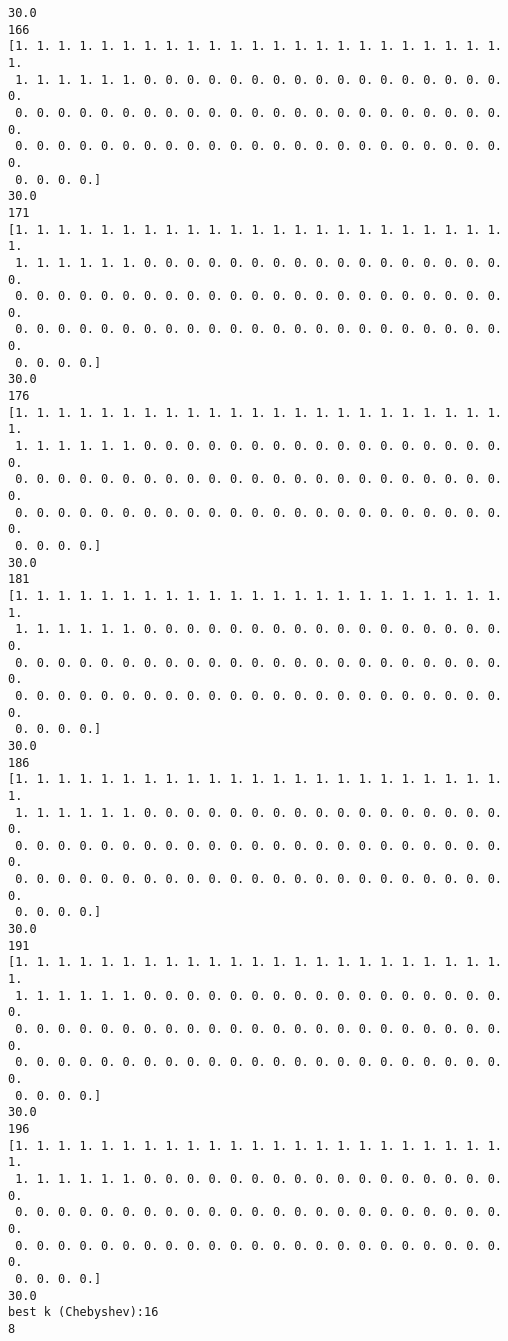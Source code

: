 \documentclass[11pt]{article}
\begin{document}
\begin{Verbatim}[commandchars=\\\{\}]
30.0
166
[1. 1. 1. 1. 1. 1. 1. 1. 1. 1. 1. 1. 1. 1. 1. 1. 1. 1. 1. 1. 1. 1. 1. 1.
 1. 1. 1. 1. 1. 1. 0. 0. 0. 0. 0. 0. 0. 0. 0. 0. 0. 0. 0. 0. 0. 0. 0. 0.
 0. 0. 0. 0. 0. 0. 0. 0. 0. 0. 0. 0. 0. 0. 0. 0. 0. 0. 0. 0. 0. 0. 0. 0.
 0. 0. 0. 0. 0. 0. 0. 0. 0. 0. 0. 0. 0. 0. 0. 0. 0. 0. 0. 0. 0. 0. 0. 0.
 0. 0. 0. 0.]
30.0
171
[1. 1. 1. 1. 1. 1. 1. 1. 1. 1. 1. 1. 1. 1. 1. 1. 1. 1. 1. 1. 1. 1. 1. 1.
 1. 1. 1. 1. 1. 1. 0. 0. 0. 0. 0. 0. 0. 0. 0. 0. 0. 0. 0. 0. 0. 0. 0. 0.
 0. 0. 0. 0. 0. 0. 0. 0. 0. 0. 0. 0. 0. 0. 0. 0. 0. 0. 0. 0. 0. 0. 0. 0.
 0. 0. 0. 0. 0. 0. 0. 0. 0. 0. 0. 0. 0. 0. 0. 0. 0. 0. 0. 0. 0. 0. 0. 0.
 0. 0. 0. 0.]
30.0
176
[1. 1. 1. 1. 1. 1. 1. 1. 1. 1. 1. 1. 1. 1. 1. 1. 1. 1. 1. 1. 1. 1. 1. 1.
 1. 1. 1. 1. 1. 1. 0. 0. 0. 0. 0. 0. 0. 0. 0. 0. 0. 0. 0. 0. 0. 0. 0. 0.
 0. 0. 0. 0. 0. 0. 0. 0. 0. 0. 0. 0. 0. 0. 0. 0. 0. 0. 0. 0. 0. 0. 0. 0.
 0. 0. 0. 0. 0. 0. 0. 0. 0. 0. 0. 0. 0. 0. 0. 0. 0. 0. 0. 0. 0. 0. 0. 0.
 0. 0. 0. 0.]
30.0
181
[1. 1. 1. 1. 1. 1. 1. 1. 1. 1. 1. 1. 1. 1. 1. 1. 1. 1. 1. 1. 1. 1. 1. 1.
 1. 1. 1. 1. 1. 1. 0. 0. 0. 0. 0. 0. 0. 0. 0. 0. 0. 0. 0. 0. 0. 0. 0. 0.
 0. 0. 0. 0. 0. 0. 0. 0. 0. 0. 0. 0. 0. 0. 0. 0. 0. 0. 0. 0. 0. 0. 0. 0.
 0. 0. 0. 0. 0. 0. 0. 0. 0. 0. 0. 0. 0. 0. 0. 0. 0. 0. 0. 0. 0. 0. 0. 0.
 0. 0. 0. 0.]
30.0
186
[1. 1. 1. 1. 1. 1. 1. 1. 1. 1. 1. 1. 1. 1. 1. 1. 1. 1. 1. 1. 1. 1. 1. 1.
 1. 1. 1. 1. 1. 1. 0. 0. 0. 0. 0. 0. 0. 0. 0. 0. 0. 0. 0. 0. 0. 0. 0. 0.
 0. 0. 0. 0. 0. 0. 0. 0. 0. 0. 0. 0. 0. 0. 0. 0. 0. 0. 0. 0. 0. 0. 0. 0.
 0. 0. 0. 0. 0. 0. 0. 0. 0. 0. 0. 0. 0. 0. 0. 0. 0. 0. 0. 0. 0. 0. 0. 0.
 0. 0. 0. 0.]
30.0
191
[1. 1. 1. 1. 1. 1. 1. 1. 1. 1. 1. 1. 1. 1. 1. 1. 1. 1. 1. 1. 1. 1. 1. 1.
 1. 1. 1. 1. 1. 1. 0. 0. 0. 0. 0. 0. 0. 0. 0. 0. 0. 0. 0. 0. 0. 0. 0. 0.
 0. 0. 0. 0. 0. 0. 0. 0. 0. 0. 0. 0. 0. 0. 0. 0. 0. 0. 0. 0. 0. 0. 0. 0.
 0. 0. 0. 0. 0. 0. 0. 0. 0. 0. 0. 0. 0. 0. 0. 0. 0. 0. 0. 0. 0. 0. 0. 0.
 0. 0. 0. 0.]
30.0
196
[1. 1. 1. 1. 1. 1. 1. 1. 1. 1. 1. 1. 1. 1. 1. 1. 1. 1. 1. 1. 1. 1. 1. 1.
 1. 1. 1. 1. 1. 1. 0. 0. 0. 0. 0. 0. 0. 0. 0. 0. 0. 0. 0. 0. 0. 0. 0. 0.
 0. 0. 0. 0. 0. 0. 0. 0. 0. 0. 0. 0. 0. 0. 0. 0. 0. 0. 0. 0. 0. 0. 0. 0.
 0. 0. 0. 0. 0. 0. 0. 0. 0. 0. 0. 0. 0. 0. 0. 0. 0. 0. 0. 0. 0. 0. 0. 0.
 0. 0. 0. 0.]
30.0
best k (Chebyshev):16
8

    \end{Verbatim}
\end{document}
